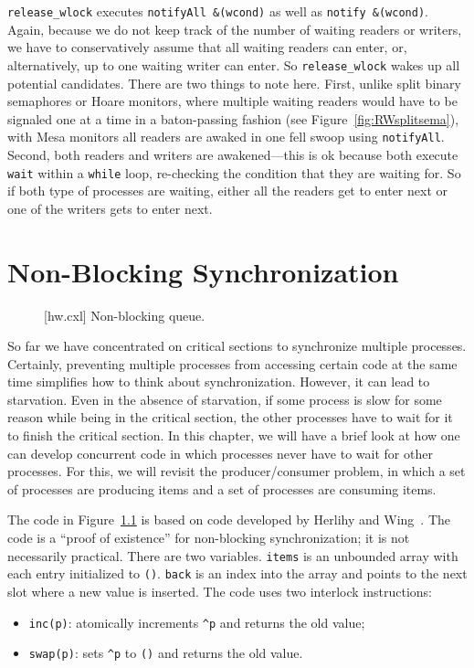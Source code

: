 \documentclass{report}
\newenvironment{code}{
\tcolorbox
}{
\endtcolorbox
}
\begin{document}
\texttt{release\_wlock} executes \texttt{notifyAll \&(wcond)} as well as
\texttt{notify \&(wcond)}.
Again, because we do not keep track of the number of waiting readers or writers, we
have to conservatively assume that all waiting readers can enter, or, alternatively,
up to one waiting writer can enter.  So \texttt{release\_wlock} wakes up all
potential candidates.
There are two things to note here.  First, unlike split binary semaphores or Hoare
monitors, where multiple waiting readers would have to be signaled one at a time in a
baton-passing fashion (see Figure~\ref{fig:RWsplitsema}), with Mesa monitors
all readers are awaked in one fell swoop using \texttt{notifyAll}.
Second, both readers and writers are awakened---this is ok because both execute
\texttt{wait} within a \texttt{while} loop, re-checking the condition that they
are waiting for.  So if both type of processes are waiting, either all the readers
get to enter next or one of the writers gets to enter next.

\chapter{Non-Blocking Synchronization}

\begin{figure}
\begin{code}
\end{code}
\caption{[hw.cxl] Non-blocking queue.}
\label{fig:hw}
\end{figure}

So far we have concentrated on critical sections to synchronize multiple
processes.  Certainly, preventing multiple processes from accessing
certain code at the same time simplifies how to think about synchronization.
However, it can lead to starvation.  Even in the absence of starvation,
if some process is slow for some reason while being in the critical section,
the other processes have to wait for it to finish the critical section.
In this chapter, we will have a brief look at how one can develop concurrent
code in which processes never have to wait for other processes.
For this, we will revisit the producer/consumer problem, in which a
set of processes are producing items and a set of processes are
consuming items.

The code in Figure~\ref{fig:hw} is based on code developed by Herlihy and
Wing~\cite{HW87}.
The code is a ``proof of existence'' for non-blocking synchronization; it
is not necessarily practical.
There are two variables.  \texttt{items} is an unbounded array with each
entry initialized to \texttt{()}.  \texttt{back} is an index into the
array and points to the next slot where a new value is inserted.
The code uses two interlock instructions:
\begin{itemize}
\item \texttt{inc(p)}: atomically increments \texttt{\^{}p} and returns
the old value;
\item \texttt{swap(p)}: sets \texttt{\^{}p} to \texttt{()} and returns
the old value.
\end{itemize}
\end{document}
